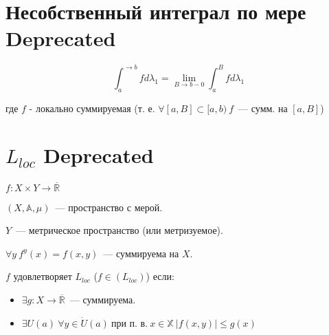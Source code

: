 \documentclass[paper=a4, fontsize=17pt]{article}
\begin{document}
	\section{Несобственный интеграл по мере \Large Deprecated}

	$$ \int_{a}^{\rightarrow b} f d\lambda_1 = \lim\limits_{B \rightarrow b-0} \int_{a}^{B} f d\lambda_1 $$

	где $ f $ - локально суммируемая (т. е. $ \forall [a, B] \subset [a, b) ~ f $~--- сумм. на $ [a, B] $)

	\section{$ L_{loc} $ \Large Deprecated}

	$ f : X \times Y \rightarrow \overline{\mathbb{R}}$

	$ (X, \mathds{A}, \mu) $~--- пространство с мерой.

	$Y$~--- метрическое пространство (или метризуемое).

	$\forall y \ f^y(x) = f(x, y)$~--- суммируема на $X$.

	$f$ удовлетворяет $L_{loc}$ ($ f \in (L_{loc}) $) если:
	\begin{itemize}
		\item $ \exists g : X \rightarrow \overline{\mathbb{R}} $~--- суммируема.
		\item $ \exists U(a) \ \forall y \in \dot{U} (a) \ \text{при п. в.} ~ x \in \mathbb{X} ~ |f(x, y)| \leq g(x)$
	\end{itemize}
\end{document}

